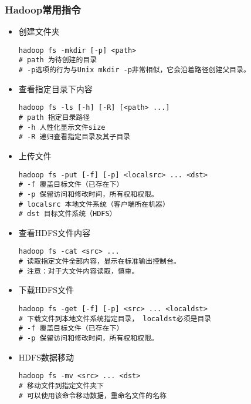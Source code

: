 \documentclass[bachelor]{thesis-uestc}
\begin{document}
\subsubsection{Hadoop常用指令}
\begin{itemize}
\item 创建文件夹
\begin{verbatim}
hadoop fs -mkdir [-p] <path> 
# path 为待创建的目录
# -p选项的行为与Unix mkdir -p非常相似，它会沿着路径创建父目录。
\end{verbatim}
\item 查看指定目录下内容
\begin{verbatim}
hadoop fs -ls [-h] [-R] [<path> ...]
# path 指定目录路径
# -h 人性化显示文件size
# -R 递归查看指定目录及其子目录
\end{verbatim}

\item 上传文件
\begin{verbatim}
hadoop fs -put [-f] [-p] <localsrc> ... <dst>
# -f 覆盖目标文件（已存在下）
# -p 保留访问和修改时间，所有权和权限。
# localsrc 本地文件系统（客户端所在机器）
# dst 目标文件系统（HDFS）
\end{verbatim}

\item 查看HDFS文件内容
\begin{verbatim}
hadoop fs -cat <src> ...
# 读取指定文件全部内容，显示在标准输出控制台。
# 注意：对于大文件内容读取，慎重。
\end{verbatim}

\item 下载HDFS文件
\begin{verbatim}
hadoop fs -get [-f] [-p] <src> ... <localdst>
# 下载文件到本地文件系统指定目录， localdst必须是目录
# -f 覆盖目标文件（已存在下）
# -p 保留访问和修改时间，所有权和权限。
\end{verbatim}
\item HDFS数据移动
\begin{verbatim}
hadoop fs -mv <src> ... <dst>
# 移动文件到指定文件夹下
# 可以使用该命令移动数据，重命名文件的名称
\end{verbatim}

\end{itemize}
\end{document}

